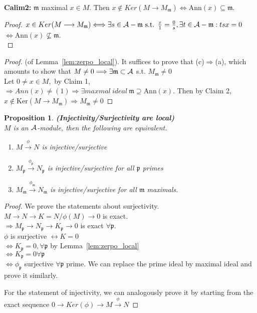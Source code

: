 \documentclass[11pt]{article}
\newtheorem{prop}[thm]{Proposition}
\newcommand{\scm}{{\mathfrak m}}
\newcommand{\scp}{{\mathfrak p}}
\newcommand{\cala}{{\cal A}}
\newcommand{\Lrta}{\Longrightarrow}
\newcommand{\lrta}{\longrightarrow}
\newcommand{\llrta}{\longleftrightarrow}
\newcommand{\Llrta}{\Longleftrightarrow}
\begin{document}
\noindent\textbf{Calim2:}
$\scm$ maximal $x\in M$.
Then $x\not\in Ker(M\lrta M_\scm)\Llrta \text{Ann}(x)\subseteq \scm$. 
\begin{proof}
$x\in Ker(M\lrta M_\scm)\Llrta \exists s\in \cala-\scm\text{ s.t. } \frac{x}{1}=\frac{0}{s},\exists t\in \cala-\scm: tsx=0$ $\Llrta \text{Ann}(x)\not \subseteq \scm$.\\
\end{proof}
\begin{proof}
(of Lemma~\ref{lem:zerpo_local}).
It suffices to prove that (c)$\Lrta$(a), which amounts to show that $M\neq 0\Lrta \exists \scm\subset \cala $ s.t. $M_\scm\neq 0$\\
Let $0\neq x\in M,$ by Claim 1,\\
 $\Lrta Ann(x)\neq (1)\Lrta \exists maxmal\ ideal\ \scm\supseteq \text{Ann}(x)$. Then by Claim 2,\\
$x\notin \text{Ker}(M\lrta M_\scm)\Lrta M_\scm\neq 0$
\end{proof}
\begin{prop}\label{prop:local_inj_surj}
\textbf{(Injectivity/Surjectivity are local)}\\
$M$ is an $\cala$-module, then the following are equivalent.
\begin{enumerate}[label=(\alph*)]
\item $M\overset{\phi}{\lrta}N$ is injective/surjective
\item $M_\scp\overset{\phi_\scp}{\lrta}N_\scp$ is injective/surjective for all $\scp$ primes
\item $M_\scm\overset{\phi_\scm}{\lrta}N_\scm$ is injective/surjective for all $\scm$ maximals.
\end{enumerate}
\end{prop}
\begin{proof}
We prove the statements about surjectivity.\\
$M\lrta N\lrta K=N/\phi(M)\lrta 0$ is exact.\\
$\Lrta M_\scp\lrta N_\scp\lrta K_\scp\lrta 0$ is exact $\forall \scp$.\\
$\phi$ is surjective $\llrta K=0$\\
$\Llrta K_\scp=0,\forall\scp$ by Lemma~\ref{lem:zerpo_local}\\
$\Llrta K_\scp=0\forall\scp$\\
$\Llrta \phi_\scp$ surjective $\forall\scp$ prime. We can replace the prime ideal by maximal ideal and prove it similarly.

For the statement of injectivity, we can analogously prove it by starting from the exact sequence
$0\lrta Ker(\phi)\lrta M\overset{\phi}{\lrta}N$
\end{proof}
\end{document}
